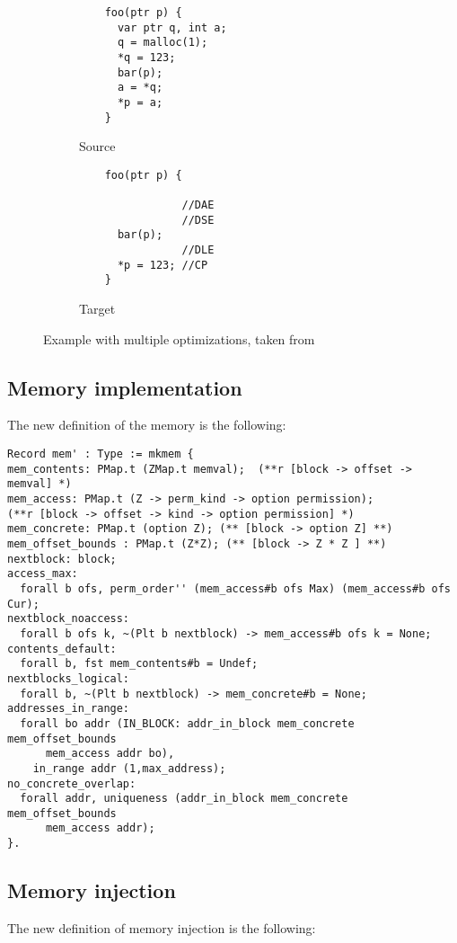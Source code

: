 \begin{figure}[H]
\begin{subfigure}{.48\textwidth}
  \begin{lstlisting}
    foo(ptr p) {
      var ptr q, int a;
      q = malloc(1);
      *q = 123;
      bar(p);
      a = *q;
      *p = a;
    }
  \end{lstlisting}
  \caption{Source}
  \label{fig:multiplebefore}
\end{subfigure}
\begin{subfigure}{.48\textwidth}
  \begin{lstlisting}
    foo(ptr p) {

                //DAE
                //DSE
      bar(p);
                //DLE
      *p = 123; //CP
    }
  \end{lstlisting}
  \caption{Target}
  \label{fig:multipleafter}
\end{subfigure}
\caption{Example with multiple optimizations, taken from~\cite{DBLP:conf/pldi/KangHMGZV15}}
\label{fig:multipleexamples}
\end{figure}

\subsection{Memory implementation}
\label{subsec:memimplem}
The new definition of the memory is the following:

\begin{lstlisting}[basicstyle=\footnotesize]
Record mem' : Type := mkmem {
mem_contents: PMap.t (ZMap.t memval);  (**r [block -> offset -> memval] *)
mem_access: PMap.t (Z -> perm_kind -> option permission);
(**r [block -> offset -> kind -> option permission] *)
mem_concrete: PMap.t (option Z); (** [block -> option Z] **)
mem_offset_bounds : PMap.t (Z*Z); (** [block -> Z * Z ] **)
nextblock: block;
access_max:
  forall b ofs, perm_order'' (mem_access#b ofs Max) (mem_access#b ofs Cur);
nextblock_noaccess:
  forall b ofs k, ~(Plt b nextblock) -> mem_access#b ofs k = None;
contents_default:
  forall b, fst mem_contents#b = Undef;
nextblocks_logical:
  forall b, ~(Plt b nextblock) -> mem_concrete#b = None;
addresses_in_range:
  forall bo addr (IN_BLOCK: addr_in_block mem_concrete mem_offset_bounds
      mem_access addr bo),
    in_range addr (1,max_address);
no_concrete_overlap:
  forall addr, uniqueness (addr_in_block mem_concrete mem_offset_bounds
      mem_access addr);
}.
\end{lstlisting}

\subsection{Memory injection}
\label{subsec:injectimplem}
The new definition of memory injection is the following:


